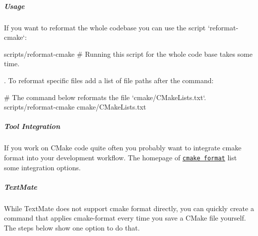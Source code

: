 \subparagraph*{Usage}

If you want to reformat the whole codebase you can use the script `reformat-\/cmake`\+:


\begin{DoxyCode}
scripts/reformat-cmake # Running this script for the whole code base takes some time.
\end{DoxyCode}


. To reformat specific files add a list of file paths after the command\+:


\begin{DoxyCode}
# The command below reformats the file `cmake/CMakeLists.txt`.
scripts/reformat-cmake cmake/CMakeLists.txt
\end{DoxyCode}


\subparagraph*{Tool Integration}

If you work on C\+Make code quite often you probably want to integrate cmake format into your development workflow. The homepage of \href{https://github.com/cheshirekow/cmake_format#integrations}{\tt cmake format} list some integration options.

\subparagraph*{Text\+Mate}

While Text\+Mate does not support cmake format directly, you can quickly create a command that applies {\ttfamily cmake-\/format} every time you save a C\+Make file yourself. The steps below show one option to do that.


